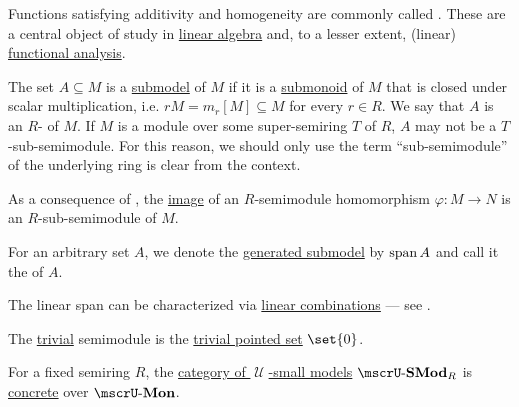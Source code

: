 \begin{definition}
\begin{thmenum}[resume=def:semimodule]
    Functions satisfying additivity and homogeneity are commonly called . These are a central object of study in \hyperref[sec:linear_algebra]{linear algebra} and, to a lesser extent, (linear) \hyperref[sec:functional_analysis]{functional analysis}.

     The set \( A \subseteq M \) is a \hyperref[thm:substructure_is_model]{submodel} of \( M \) if it is a \hyperref[def:monoid/submodel]{submonoid} of \( M \) that is closed under scalar multiplication, i.e. \( rM = m_r[M] \subseteq M \) for every \( r \in R \). We say that \( A \) is an \( R \)- of \( M \). If \( M \) is a module over some super-semiring \( T \) of \( R \), \( A \) may not be a \( T \)-sub-semimodule. For this reason, we should only use the term \enquote{sub-semimodule} of the underlying ring is clear from the context.

    As a consequence of , the \hyperref[def:multi_valued_function/image]{image} of an \( R \)-semimodule homomorphism \( \varphi: M \to N \) is an \( R \)-sub-semimodule of \( M \).

    For an arbitrary set \( A \), we denote the \hyperref[def:first_order_generated_substructure]{generated submodel} by \( \operatorname{span}{ A } \) and call it the  of \( A \).

    The linear span can be characterized via \hyperref[def:linear_combination]{linear combinations} --- see .

     The \hyperref[thm:substructures_form_complete_lattice/bottom]{trivial} semimodule is the \hyperref[def:pointed_set/trivial]{trivial pointed set} \( \set{ 0 } \).

     For a fixed semiring \( R \), the \hyperref[def:category_of_small_first_order_models]{category of \( \mscrU \)-small models} \( \ucat{SMod}_R \) is \hyperref[def:concrete_category]{concrete} over \hyperref[def:monoid]{\( \ucat{Mon} \)}.
  \end{thmenum}
\end{definition}
